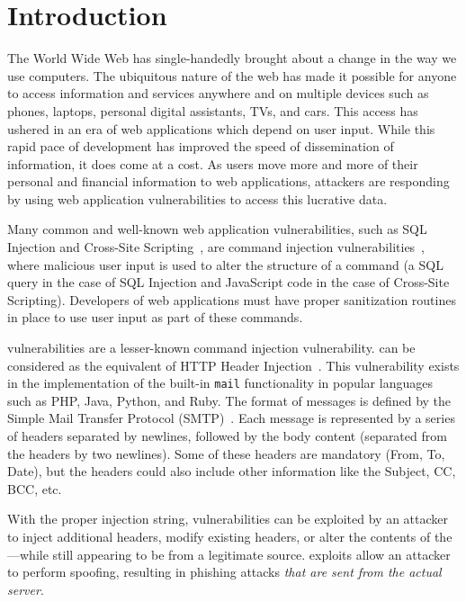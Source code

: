 \section{Introduction}
The World Wide Web has single-handedly brought about a change in the way we use computers. The ubiquitous nature of the web has made it possible for anyone to access information and services anywhere and on multiple devices such as phones, laptops, personal digital assistants, TVs, and cars. This access has ushered in an era of web applications which depend on user input. While this rapid pace of development has improved the speed of dissemination of information, it does come at a cost. As users move more and more of their personal and financial information to web applications, attackers are responding by using web application vulnerabilities to access this lucrative data.

Many common and well-known web application vulnerabilities, such as SQL Injection and Cross-Site Scripting~\cite{OWASPT10}, are command injection vulnerabilities~\cite{commandinjection}, where malicious user input is used to alter the structure of a command (a SQL query in the case of SQL Injection and JavaScript code in the case of Cross-Site Scripting). Developers of web applications must have proper sanitization routines in place to use user input as part of these commands. 

\ehi vulnerabilities are a lesser-known command injection vulnerability. \ehi can be considered as the \email equivalent of HTTP Header Injection~\cite{wiki:HTTP_headerinjection}. This vulnerability exists in the implementation of the built-in \texttt{mail} functionality in popular languages such as PHP, Java, Python, and Ruby. The format of \email messages is defined by the Simple Mail Transfer Protocol (SMTP)~\cite{rfc5322}. Each \email message is represented by a series of headers separated by newlines, followed by the body content (separated from the headers by two newlines). Some of these headers are mandatory (From, To, Date), but the headers could also include other information like the Subject, CC, BCC, etc.

With the proper injection string, \ehi vulnerabilities can be exploited by an attacker to inject additional headers, modify existing headers, or alter the contents of the \email---while still appearing to be from a legitimate source. \ehi exploits allow an attacker to perform \email spoofing, resulting in phishing attacks \emph{that are sent from the actual \email server}.


